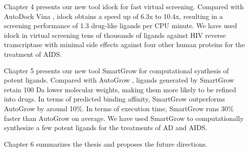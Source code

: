 Chapter 4 presents our new tool idock for fast virtual screening. Compared with AutoDock Vina \citep{595-2010}, idock obtains a speed up of 6.3x to 10.4x, resulting in a screening performance of 1.3 drug-like ligands per CPU minute. We have used idock in virtual screening tens of thousands of ligands against HIV reverse transcriptase with minimal side effects against four other human proteins for the treatment of AIDS.

Chapter 5 presents our new tool SmartGrow for computational synthesis of potent ligands. Compared with AutoGrow \citep{466-2009}, ligands generated by SmartGrow retain 100 Da lower molecular weights, making them more likely to be refined into drugs. In terms of predicted binding affinity, SmartGrow outperforms AutoGrow by around 10\%. In terms of execution time, SmartGrow runs 30\% faster than AutoGrow on average. We have used SmartGrow to computationally synthesize a few potent ligands for the treatments of AD and AIDS.

Chapter 6 summarizes the thesis and proposes the future directions.

\chapterend
